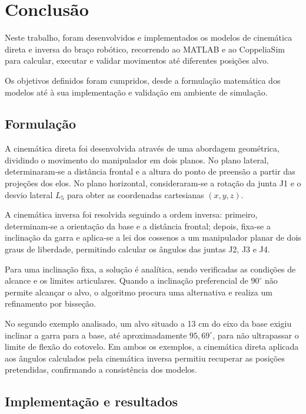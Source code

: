 
\chapter{Conclusão}
\label{ch:conclusao}

Neste trabalho, foram desenvolvidos e implementados os modelos de cinemática direta e inversa do braço robótico, recorrendo ao MATLAB e ao CoppeliaSim para calcular, executar e validar movimentos até diferentes posições alvo.

Os objetivos definidos foram cumpridos, desde a formulação matemática dos modelos até à sua implementação e validação em ambiente de simulação.

\section*{Formulação}

A cinemática direta foi desenvolvida através de uma abordagem geométrica, dividindo o movimento do manipulador em dois planos. No plano lateral, determinaram-se a distância frontal e a altura do ponto de preensão a partir das projeções dos elos. No plano horizontal, consideraram-se a rotação da junta J1 e o desvio lateral $L_5$ para obter as coordenadas cartesianas $(x,y,z)$.

A cinemática inversa foi resolvida seguindo a ordem inversa: primeiro, determinam-se a orientação da base e a distância frontal; depois, fixa-se a inclinação da garra e aplica-se a lei dos cossenos a um manipulador planar de dois graus de liberdade, permitindo calcular os ângulos das juntas J2, J3 e J4.

Para uma inclinação fixa, a solução é analítica, sendo verificadas as condições de alcance e os limites articulares. Quando a inclinação preferencial de $90^\circ$ não permite alcançar o alvo, o algoritmo procura uma alternativa e realiza um refinamento por bisseção.

No segundo exemplo analisado, um alvo situado a 13 cm do eixo da base exigiu inclinar a garra para a base, até aproximadamente $95{,}69^\circ$, para não ultrapassar o limite de flexão do cotovelo. Em ambos os exemplos, a cinemática direta aplicada aos ângulos calculados pela cinemática inversa permitiu recuperar as posições pretendidas, confirmando a consistência dos modelos.

\section*{Implementação e resultados}

